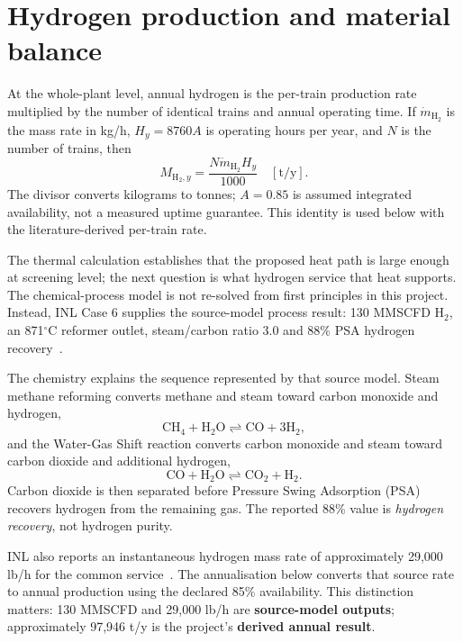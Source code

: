 \section{Hydrogen production and material balance}\label{sec:hydrogen}
At the whole-plant level, annual hydrogen is the per-train production rate multiplied by the number of identical trains and annual operating time. If $\dot m_{\mathrm{H_2}}$ is the mass rate in kg/h, $H_y=8760A$ is operating hours per year, and $N$ is the number of trains, then
\[
M_{\mathrm{H_2},y}=\frac{N\dot m_{\mathrm{H_2}}H_y}{1000}
\quad[\mathrm{t/y}].
\]
The divisor converts kilograms to tonnes; $A=0.85$ is assumed integrated availability, not a measured uptime guarantee. This identity is used below with the literature-derived per-train rate.

The thermal calculation establishes that the proposed heat path is large enough at screening level; the next question is what hydrogen service that heat supports. The chemical-process model is not re-solved from first principles in this project. Instead, INL Case 6 supplies the source-model process result: 130 MMSCFD H$_2$, an 871$^\circ$C reformer outlet, steam/carbon ratio 3.0 and 88\% PSA hydrogen recovery~\cite{inltev953,inltev961}.

The chemistry explains the sequence represented by that source model. Steam methane reforming converts methane and steam toward carbon monoxide and hydrogen,
\[
\mathrm{CH_4+H_2O\rightleftharpoons CO+3H_2},
\]
and the Water-Gas Shift reaction converts carbon monoxide and steam toward carbon dioxide and additional hydrogen,
\[
\mathrm{CO+H_2O\rightleftharpoons CO_2+H_2}.
\]
Carbon dioxide is then separated before Pressure Swing Adsorption (PSA) recovers hydrogen from the remaining gas. The reported 88\% value is \emph{hydrogen recovery}, not hydrogen purity.

INL also reports an instantaneous hydrogen mass rate of approximately 29,000 lb/h for the common service~\cite{inltev953,inltev961}. The annualisation below converts that source rate to annual production using the declared 85\% availability. This distinction matters: 130 MMSCFD and 29,000 lb/h are \textbf{source-model outputs}; approximately 97,946 t/y is the project's \textbf{derived annual result}.


\HydrogenScaleFigure

